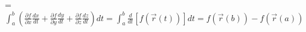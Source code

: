 \documentclass[preview]{standalone}
\begin{document}
\begin{center}
=$\int_{a}^{b} (\frac{\partial f}{\partial x} \frac{dx}{dt}+\frac{\partial f}{\partial y} \frac{dy}{dt}+\frac{\partial f}{\partial z} \frac{dz}{dt})dt=\int_{a}^{b} \frac{d}{dt}[f(\vec{r}(t))] dt=f(\vec{r}(b))-f(\vec{r}(a))$
\end{center}
\end{document}
